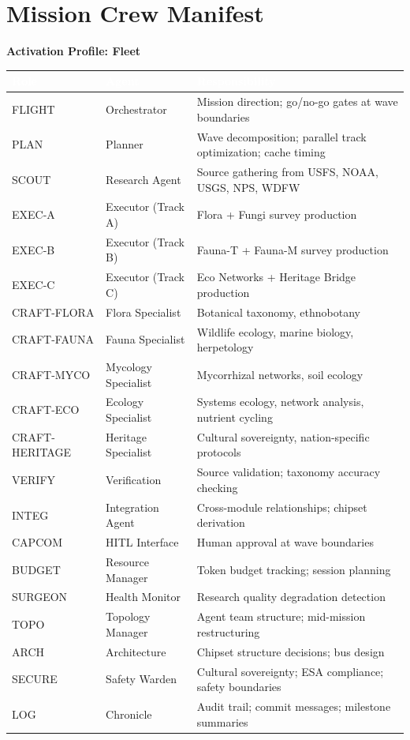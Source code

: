 \documentclass[11pt,letterpaper]{article}
\newcommand{\tableheader}[1]{\textbf{\sffamily\textcolor{white}{#1}}}
\begin{document}
\section{Mission Crew Manifest}

\textbf{Activation Profile: Fleet}

\begin{center}
\begin{tabularx}{\textwidth}{L{2cm}L{3cm}X}
\toprule
{}
\tableheader{Role} & \tableheader{Agent} & \tableheader{Responsibility} \\
\midrule
FLIGHT & Orchestrator & Mission direction; go/no-go gates at wave boundaries \\
PLAN & Planner & Wave decomposition; parallel track optimization; cache timing \\
SCOUT & Research Agent & Source gathering from USFS, NOAA, USGS, NPS, WDFW \\
EXEC-A & Executor (Track A) & Flora + Fungi survey production \\
EXEC-B & Executor (Track B) & Fauna-T + Fauna-M survey production \\
EXEC-C & Executor (Track C) & Eco Networks + Heritage Bridge production \\
CRAFT-FLORA & Flora Specialist & Botanical taxonomy, ethnobotany \\
CRAFT-FAUNA & Fauna Specialist & Wildlife ecology, marine biology, herpetology \\
CRAFT-MYCO & Mycology Specialist & Mycorrhizal networks, soil ecology \\
CRAFT-ECO & Ecology Specialist & Systems ecology, network analysis, nutrient cycling \\
CRAFT-HERITAGE & Heritage Specialist & Cultural sovereignty, nation-specific protocols \\
VERIFY & Verification & Source validation; taxonomy accuracy checking \\
INTEG & Integration Agent & Cross-module relationships; chipset derivation \\
CAPCOM & HITL Interface & Human approval at wave boundaries \\
BUDGET & Resource Manager & Token budget tracking; session planning \\
SURGEON & Health Monitor & Research quality degradation detection \\
TOPO & Topology Manager & Agent team structure; mid-mission restructuring \\
ARCH & Architecture & Chipset structure decisions; bus design \\
SECURE & Safety Warden & Cultural sovereignty; ESA compliance; safety boundaries \\
LOG & Chronicle & Audit trail; commit messages; milestone summaries \\
\bottomrule
\end{tabularx}
\end{center}
\end{document}
